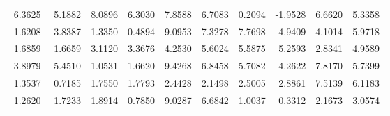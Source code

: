 \begin{exercise}
\begin{table}[h]
{\begin{tabular}{rr|rr|rr|rr|rr}
		6.3625 & 5.1882 	&	8.0896 & 6.3030 	&	7.8588 & 6.7083 	&	0.2094 & -1.9528 	&	6.6620 & 5.3358 	\\
		-1.6208 & -3.8387 	&	1.3350 & 0.4894 	&	9.0953 & 7.3278 	&	7.7698 & 4.9409 	&	4.1014 & 5.9718 	\\
		1.6859 & 1.6659 	&	3.1120 & 3.3676 	&	4.2530 & 5.6024 	&	5.5875 & 5.2593 	&	2.8341 & 4.9589 	\\
		3.8979 & 5.4510 	&	1.0531 & 1.6620 	&	9.4268 & 6.8458 	&	5.7082 & 4.2622 	&	7.8170 & 5.7399 	\\
		1.3537 & 0.7185 	&	1.7550 & 1.7793 	&	2.4428 & 2.1498 	&	2.5005 & 2.8861 	&	7.5139 & 6.1183 	\\
		1.2620 & 1.7233 	&	1.8914 & 0.7850 	&	9.0287 & 6.6842 	&	1.0037 & 0.3312 	&	2.1673 & 3.0574 	\\
		
		\hline
	\end{tabular}
	}
\end{table}
\end{exercise}